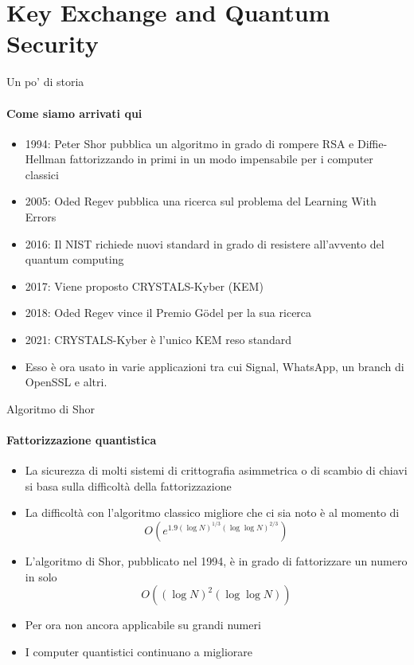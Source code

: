 \section{Key Exchange and Quantum Security}

\begin{frame}{Un po' di storia}

\framesubtitle{Come siamo arrivati qui}

\begin{itemize}%
    \item 1994: Peter Shor pubblica un algoritmo in grado di rompere RSA e Diffie-Hellman fattorizzando in primi in un modo impensabile per i computer classici
    \item 2005: Oded Regev pubblica una ricerca sul problema del Learning With Errors
    \item 2016: Il NIST richiede nuovi standard in grado di resistere all'avvento del quantum computing
    \item 2017: Viene proposto CRYSTALS-Kyber (KEM)
    \item 2018: Oded Regev vince il Premio Gödel per la sua ricerca
    \item 2021: CRYSTALS-Kyber è l'unico KEM reso standard
    \item Esso è ora usato in varie applicazioni tra cui Signal, WhatsApp, un branch di OpenSSL e altri.
\end{itemize}

\end{frame}

\begin{frame}{Algoritmo di Shor}
\framesubtitle{Fattorizzazione quantistica}

\begin{itemize}%
    \item La sicurezza di molti sistemi di crittografia asimmetrica o di scambio di chiavi si basa sulla difficoltà della fattorizzazione
    \item La difficoltà con l'algoritmo classico migliore che ci sia noto è al momento di \[
            O\left(e^{1.9(\log N)^{1/3}(\log\log N)^{2/3}}\right)
\]
    \item L'algoritmo di Shor, pubblicato nel 1994, è in grado di fattorizzare un numero in solo \[
    O\left((\log N)^2(\log\log N)\right)
\]
    \item Per ora non ancora applicabile su grandi numeri
    \item I computer quantistici continuano a migliorare
\end{itemize}
\end{frame}

